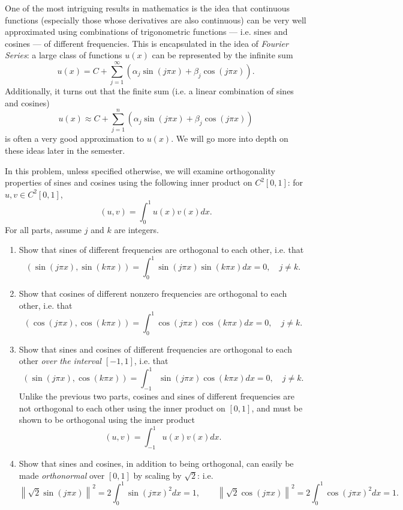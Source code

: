 One of the most intriguing results in mathematics is the idea that continuous functions (especially those whose derivatives are also continuous) can be very well approximated using combinations of trigonometric functions --- i.e. sines and cosines --- of different frequencies.  This is encapsulated in the idea of \emph{Fourier Series}: a large class of functions $u(x)$ can be represented by the infinite sum 
\[
u(x) = C + \sum_{j = 1}^\infty\left( \alpha_j \sin(j\pi x) + \beta_j \cos(j\pi x)\right).
\]
Additionally, it turns out that the finite sum (i.e. a linear combination of sines and cosines)
\[
u(x) \approx C + \sum_{j=1}^n  \left( \alpha_j \sin(j\pi x) + \beta_j \cos(j\pi x)\right)
\]
is often a very good approximation to $u(x)$.  We will go more into depth on these ideas later in the semester.  

In this problem, unless specified otherwise, we will examine orthogonality properties of sines and cosines using the following inner product on $C^2[0,1]$: for $u, v\in C^2[0,1]$, 
\[
(u,v) = \int_0^1 u(x)v(x)dx.
\]
For all parts, assume $j$ and $k$ are integers.

\begin{enumerate}
\item Show that sines of different frequencies are orthogonal to each other, i.e. that
\[
\left( \sin( j \pi x), \sin(k \pi x)\right) = \int_0^1 \sin( j \pi x) \sin(k \pi x)dx = 0, \quad j \neq k.
\]
\item Show that cosines of different nonzero frequencies are orthogonal to each other, i.e. that
\[
\left( \cos( j \pi x), \cos(k\pi x) \right) = \int_0^1 \cos( j \pi x) \cos(k\pi x)dx = 0, \quad j\neq k.
\]
\item Show that sines and cosines of different frequencies are orthogonal to each other \emph{over the interval $[-1,1]$}, i.e. that
\[
\left( \sin( j \pi x), \cos(k\pi x)\right) = \int_{-1}^1 \sin( j \pi x) \cos(k\pi x)dx = 0, \quad j \neq k. 
\]
Unlike the previous two parts, cosines and sines of different frequencies are not orthogonal to each other using the inner product on $[0,1]$, and must be shown to be orthogonal using the inner product
\[
(u,v) = \int_{-1}^1 u(x)v(x)dx.
\]
\item Show that sines and cosines, in addition to being orthogonal, can easily be made \emph{orthonormal} over $[0,1]$ by scaling by $\sqrt{2}$: i.e.
\[
\left\|\sqrt{2}\sin(j\pi x)\right\|^2 = 2\int_0^1 \sin(j\pi x)^2 dx = 1, \qquad \left\|\sqrt{2}\cos(j\pi x)\right\|^2 = 2\int_0^1 \cos(j\pi x)^2 dx = 1.
\]

\end{enumerate}


